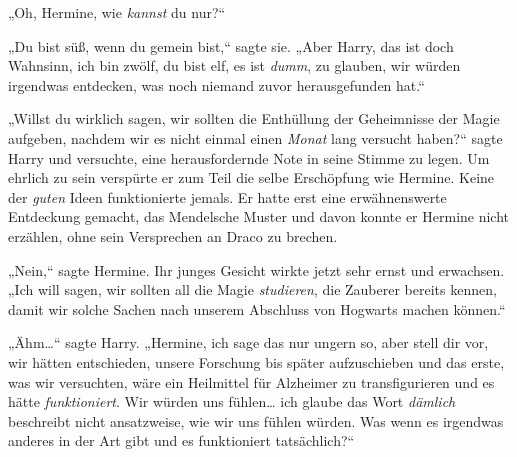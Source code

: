 „Oh, Hermine, wie \emph{kannst} du nur?“

„Du bist süß, wenn du gemein bist,“ sagte sie. „Aber Harry, das ist doch Wahnsinn, ich bin zwölf, du bist elf, es ist \emph{dumm}, zu glauben, wir würden irgendwas entdecken, was noch niemand zuvor herausgefunden hat.“

„Willst du wirklich sagen, wir sollten die Enthüllung der Geheimnisse der Magie aufgeben, nachdem wir es nicht einmal einen \emph{Monat} lang versucht haben?“ sagte Harry und versuchte, eine herausfordernde Note in seine Stimme zu legen. Um ehrlich zu sein verspürte er zum Teil die selbe Erschöpfung wie Hermine. Keine der \emph{guten} Ideen funktionierte jemals. Er hatte erst eine erwähnenswerte Entdeckung gemacht, das Mendelsche Muster und davon konnte er Hermine nicht erzählen, ohne sein Versprechen an Draco zu brechen.

„Nein,“ sagte Hermine. Ihr junges Gesicht wirkte jetzt sehr ernst und erwachsen. „Ich will sagen, wir sollten all die Magie \emph{studieren}, die Zauberer bereits kennen, damit wir solche Sachen nach unserem Abschluss von Hogwarts machen können.“

„Ähm…“ sagte Harry. „Hermine, ich sage das nur ungern so, aber stell dir vor, wir hätten entschieden, unsere Forschung bis später aufzuschieben und das erste, was wir versuchten, wäre ein Heilmittel für Alzheimer zu transfigurieren und es hätte \emph{funktioniert}. Wir würden uns fühlen… ich glaube das Wort \emph{dämlich} beschreibt nicht ansatzweise, wie wir uns fühlen würden. Was wenn es irgendwas anderes in der Art gibt und es funktioniert tatsächlich?“

